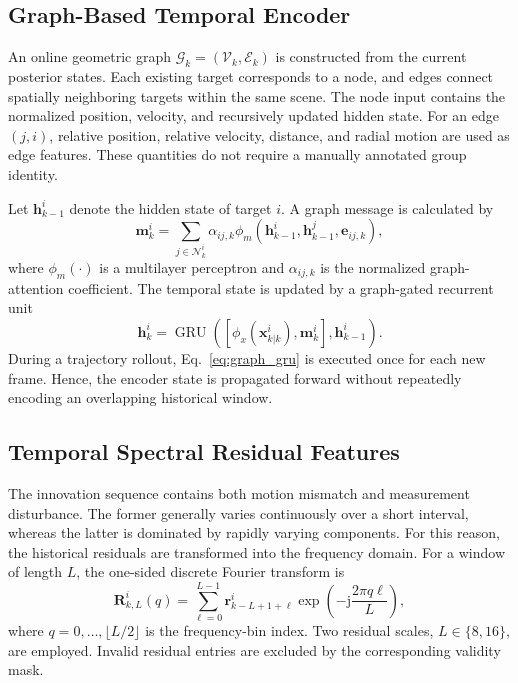 \documentclass[10pt,doublecolumn]{IEEEtaes}
\begin{document}
\subsection{Graph-Based Temporal Encoder}

An online geometric graph $\mathcal{G}_{k}=(\mathcal{V}_{k},\mathcal{E}_{k})$ is constructed from the current posterior states. Each existing target corresponds to a node, and edges connect spatially neighboring targets within the same scene. The node input contains the normalized position, velocity, and recursively updated hidden state. For an edge $(j,i)$, relative position, relative velocity, distance, and radial motion are used as edge features. These quantities do not require a manually annotated group identity.

Let $\mathbf{h}_{k-1}^{i}$ denote the hidden state of target $i$. A graph message is calculated by
\begin{equation}
\mathbf{m}_{k}^{i}=\sum_{j\in\mathcal{N}_{k}^{i}}\alpha_{ij,k}
\phi_m\!\left(\mathbf{h}_{k-1}^{i},\mathbf{h}_{k-1}^{j},\mathbf{e}_{ij,k}\right),
\label{eq:graph_message}
\end{equation}
where $\phi_m(\cdot)$ is a multilayer perceptron and $\alpha_{ij,k}$ is the normalized graph-attention coefficient. The temporal state is updated by a graph-gated recurrent unit
\begin{equation}
\mathbf{h}_{k}^{i}=\operatorname{GRU}\!\left(\left[\phi_x(\mathbf{x}_{k|k}^{i}),\mathbf{m}_{k}^{i}\right],\mathbf{h}_{k-1}^{i}\right).
\label{eq:graph_gru}
\end{equation}
During a trajectory rollout, Eq.~\eqref{eq:graph_gru} is executed once for each new frame. Hence, the encoder state is propagated forward without repeatedly encoding an overlapping historical window.

\subsection{Temporal Spectral Residual Features}

The innovation sequence contains both motion mismatch and measurement disturbance. The former generally varies continuously over a short interval, whereas the latter is dominated by rapidly varying components. For this reason, the historical residuals are transformed into the frequency domain. For a window of length $L$, the one-sided discrete Fourier transform is
\begin{equation}
\mathbf{R}_{k,L}^{i}(q)=\sum_{\ell=0}^{L-1}\mathbf{r}_{k-L+1+\ell}^{i}
\exp\!\left(-\mathrm{j}\frac{2\pi q\ell}{L}\right),
\label{eq:residual_fft}
\end{equation}
where $q=0,\ldots,\lfloor L/2\rfloor$ is the frequency-bin index. Two residual scales, $L\in\{8,16\}$, are employed. Invalid residual entries are excluded by the corresponding validity mask.
\end{document}
